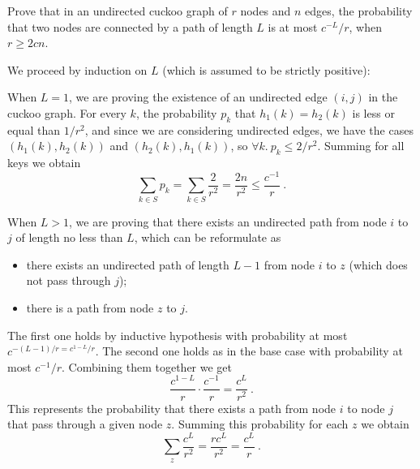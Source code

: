 \exercise

Prove that in an undirected cuckoo graph of $r$ nodes and $n$ edges, the
probability that two nodes are connected by a path of length $L$ is at most
$c^{-L}/r$, when $r \ge 2cn$.

\solution

We proceed by induction on $L$ (which is assumed to be strictly positive):
%
\begin{description}[labelindent=1cm, leftmargin=1.5cm]

  \item[\bf Base case.] When $L = 1$, we are proving the existence of an
  undirected edge $(i, j)$ in the cuckoo graph. For every $k$, the probability
  $p_k$ that $h_1(k) = h_2(k)$ is less or equal than $1/r^2$, and since we are
  considering undirected edges, we have the cases $(h_1(k), h_2(k))$ and
  $(h_2(k), h_1(k))$, so $\forall k.\ p_k \le 2/r^2$. Summing for all keys we
  obtain $$\sum_{k \in S} p_k = \sum_{k \in S} \frac{2}{r^2} = \frac{2n}{r^2}
  \le  \frac{c^{-1}}{r}\ .$$

  \item[\bf Inductive case.] When $L > 1$, we are proving that there exists an
  undirected path from node $i$ to $j$ of length no less than $L$, which can be
  reformulate as
  \begin{itemize}

    \item there exists an undirected path of length $L - 1$ from node $i$ to $z$
    (which does not pass through $j$);

    \item there is a path from node $z$ to $j$.

  \end{itemize}
  The first one holds by inductive hypothesis with probability at most $c^{-(L -
  1)/r = c^{1 - L}/r}$. The second one holds as in the base case with
  probability at most $c^{-1}/r$. Combining them together we get $$\frac{c^{1 -
  L}}{r}\cdot\frac{c^{-1}}{r} = \frac{c^L}{r^2}\ .$$ This represents the
  probability that there exists a path from node $i$ to node $j$ that pass
  through a given node $z$. Summing this probability for each $z$ we obtain
  $$\sum_z \frac{c^L}{r^2} = \frac{rc^L}{r^2} = \frac{c^L}{r}\ .$$

\end{description}
